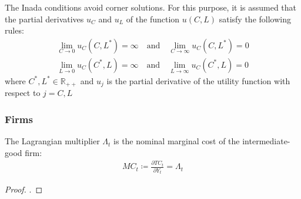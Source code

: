 \documentclass[
thesis.tex
]{subfiles}
\begin{document}

\begin{definition} \label{def:Inada Condition}
	The Inada conditions \cite{inada_two-sector_1963} avoid corner solutions. For this purpose, it is assumed that the partial derivatives $u_C$ and $u_L$ of the function $u(C, L)$ satisfy the following rules:
	\begin{align}
		\lim_{C\to 0} u_C(C,L^\ast) = \infty \quad \text{and} \quad
		\lim_{C\to \infty} u_C(C,L^\ast) = 0 \\
		\lim_{L\to 0} u_C(C^\ast,L) = \infty \quad \text{and} \quad
		\lim_{L\to \infty} u_C(C^\ast,L) = 0 \nonumber
	\end{align}
	where $C^\ast,L^\ast \in \mathbb{R}_{++}$ and $u_j$ is the partial derivative of the utility function with respect to $j=C,L$ \cite[Lecture 1, p.2]{solis-garcia_ucb_2022}
\end{definition}


\begin{definition}
	\cite[Lecture 4, p.4]{solis-garcia_ucb_2022}
\end{definition}


\subsubsection*{Firms}


\begin{lemma}\label{lemma:marginal-cost}
	The Lagrangian multiplier $\Lambda_t$ is the nominal marginal cost of the intermediate-good firm:
	\begin{align}
		MC_t \coloneq \frac{\partial TC_t}{\partial Y_t} = \Lambda_t
	\end{align}
	
	\begin{proof}
		\textcite[p.449]{simon_mathematics_1994}.
	\end{proof}
	
\end{lemma}
\end{document}
